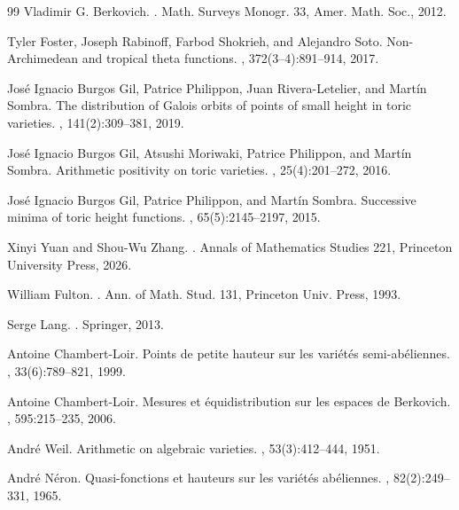 \documentclass[10pt,a4paper]{amsart}
\theoremstyle{plain}
\theoremstyle{plain}
\numberwithin{equation}{section}
\begin{document}
\begin{thebibliography}{99}
		Vladimir G. Berkovich.
		.
		\newblock Math. Surveys Monogr. 33, Amer. Math. Soc., 2012.
		
		Tyler Foster, Joseph Rabinoff, Farbod Shokrieh, and Alejandro Soto.
		\newblock Non-Archimedean and tropical theta functions.
		, 372(3--4):891--914, 2017.
		
		Jos{\'e} Ignacio Burgos Gil, Patrice Philippon, Juan Rivera-Letelier, and Mart\'in Sombra.
		\newblock The distribution of Galois orbits of points of small height in toric varieties.
		, 141(2):309--381, 2019.
		
		Jos{\'e} Ignacio Burgos Gil, Atsushi Moriwaki, Patrice Philippon, and Mart\'in Sombra.
		\newblock Arithmetic positivity on toric varieties.
		, 25(4):201--272, 2016.
		
		Jos{\'e} Ignacio Burgos Gil, Patrice Philippon, and Mart\'in Sombra.
		\newblock Successive minima of toric height functions.
		, 65(5):2145--2197, 2015.
		
		Xinyi Yuan and Shou-Wu Zhang.
		.
		\newblock Annals of Mathematics Studies 221, Princeton University Press, 2026.
		
		William Fulton.
		.
		\newblock Ann. of Math. Stud. 131, Princeton Univ. Press, 1993.
		
		Serge Lang.
		.
		\newblock Springer, 2013.
		
		Antoine Chambert-Loir.
		\newblock Points de petite hauteur sur les vari\'et\'es semi-ab\'eliennes.
		, 33(6):789--821, 1999.
		
		Antoine Chambert-Loir.
		\newblock Mesures et \'equidistribution sur les espaces de Berkovich.
		, 595:215--235, 2006.
		
		Andr{\'e} Weil.
		\newblock Arithmetic on algebraic varieties.
		, 53(3):412--444, 1951.
		
		Andr{\'e} N{\'e}ron.
		\newblock Quasi-fonctions et hauteurs sur les vari\'et\'es ab\'eliennes.
		, 82(2):249--331, 1965.
		

\end{thebibliography}
\end{document}
